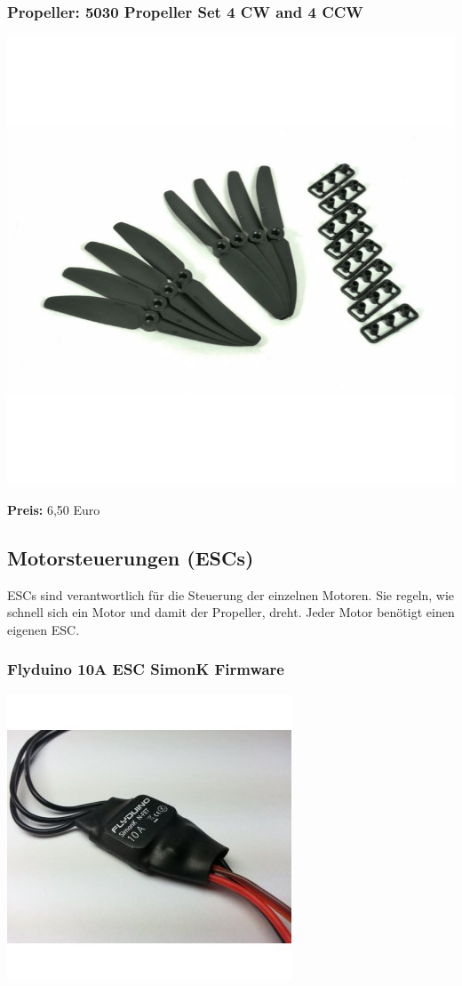 \documentclass[12pt,a4paper]{article}
\begin{document}
\subsubsection*{Propeller: 5030 Propeller Set 4 CW and 4 CCW}
\includegraphics[scale=0.3]{Bilder/5Propeller.jpg}

\textbf{Preis:} 6,50 Euro

\subsection*{Motorsteuerungen (ESCs)}
ESCs sind verantwortlich für die Steuerung der einzelnen Motoren. Sie regeln, wie schnell sich ein Motor und damit der Propeller, dreht. Jeder Motor benötigt einen eigenen ESC.

\subsubsection*{Flyduino 10A ESC SimonK Firmware}
\includegraphics[scale=0.5]{Bilder/ESC10A.jpg}
\end{document}
